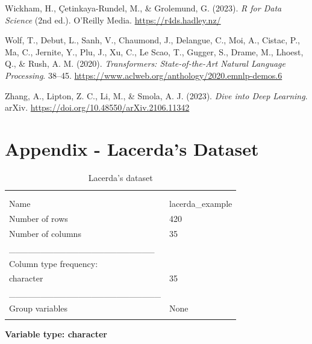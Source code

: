 \documentclass[
  12pt,
]{article}
\newlength{\cslhangindent}
\newenvironment{CSLReferences}[2] %
 {\begin{list}{}{%
  \setlength{\itemindent}{0pt}
  \setlength{\leftmargin}{0pt}
  \setlength{\parsep}{0pt}
  \ifodd #1
   \setlength{\leftmargin}{\cslhangindent}
   \setlength{\itemindent}{-1\cslhangindent}
  \fi
  \setlength{\itemsep}{#2\baselineskip}}}
 {\end{list}}
\begin{document}
\begin{CSLReferences}{1}{0}
Wickham, H., Çetinkaya-Rundel, M., \& Grolemund, G. (2023). \emph{R for
{Data} {Science}} (2nd ed.). O'Reilly Media.
\url{https://r4ds.hadley.nz/}

Wolf, T., Debut, L., Sanh, V., Chaumond, J., Delangue, C., Moi, A.,
Cistac, P., Ma, C., Jernite, Y., Plu, J., Xu, C., Le Scao, T., Gugger,
S., Drame, M., Lhoest, Q., \& Rush, A. M. (2020). \emph{Transformers:
{State}-of-the-{Art} {Natural} {Language} {Processing}}. 38--45.
\url{https://www.aclweb.org/anthology/2020.emnlp-demos.6}

Zhang, A., Lipton, Z. C., Li, M., \& Smola, A. J. (2023). \emph{Dive
into {Deep} {Learning}}. arXiv.
\url{https://doi.org/10.48550/arXiv.2106.11342}

\end{CSLReferences}

\clearpage
\appendix

\section{Appendix - Lacerda's
Dataset}\label{appendix---lacerdas-dataset}

\begin{longtable}[]{@{}ll@{}}

\toprule\noalign{}
\endfirsthead
\endhead
\bottomrule\noalign{}
\tabularnewline
\caption{Data summary}\tabularnewline
\endlastfoot
Name & lacerda\_example \\
Number of rows & 420 \\
Number of columns & 35 \\
\_\_\_\_\_\_\_\_\_\_\_\_\_\_\_\_\_\_\_\_\_\_\_ & \\
Column type frequency: & \\
character & 35 \\
\_\_\_\_\_\_\_\_\_\_\_\_\_\_\_\_\_\_\_\_\_\_\_\_ & \\
Group variables & None \\


\caption{\label{tbl-lacerda}Lacerda's dataset}

\tabularnewline
\end{longtable}

\textbf{Variable type: character}
\end{document}
